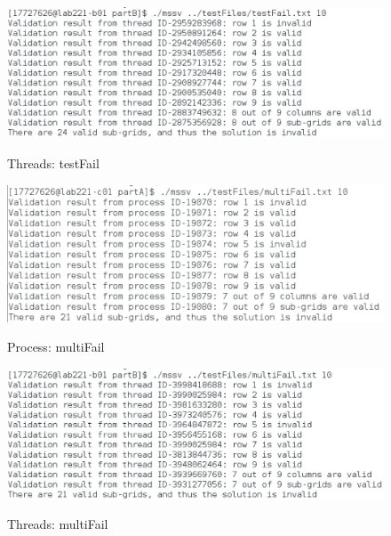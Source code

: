 \documentclass[]{article}
\begin{document}
	\begin{figure}[H]
	\caption{Threads: testFail}		
	\begin{center}
		{
			\includegraphics[height=0.25\textheight,width=1.0
			\textwidth]{Thr_testF.png}}
	\end{center}
	\end{figure}

	\begin{figure}[H]
	\caption{Process: multiFail}
	\begin{center}
		{
			\includegraphics[height=0.25\textheight,width=1.0
			\textwidth]{Pro_multiF.png}}
	\end{center}
	\end{figure}


	\begin{figure}[H]
	\caption{Threads: multiFail}		
	\begin{center}
		{
			\includegraphics[height=0.25\textheight,width=1.0
			\textwidth]{Thr_multiF.png}}
	\end{center}
	\end{figure}

\pagebreak
\end{document}
